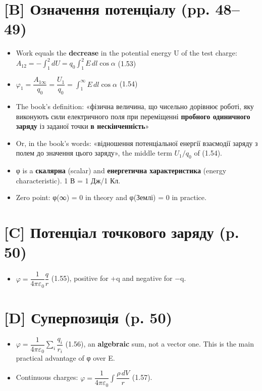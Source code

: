 \documentclass[11pt,a4paper,oneside]{book}
\begin{document}
\section*{[B] Означення потенціалу (pp. 48–49)}
\begin{itemize}
\item Work equals the \textbf{decrease} in the potential energy U of the test charge: $A_{12} = -\int_1^2 dU = q_0\int_1^2 E\,dl\cos\alpha$ (1.53)
\item $\varphi_1 = \dfrac{A_{1\infty}}{q_0} = \dfrac{U_1}{q_0} = \int_1^\infty E\,dl\cos\alpha$ (1.54)
\item The book's definition: «фізична величина, що чисельно дорівнює роботі, яку виконують сили електричного поля при переміщенні \textbf{пробного одиничного заряду} із заданої точки \textbf{в нескінченність}»
\item Or, in the book's words: «відношення потенціальної енергії взаємодії заряду з полем до значення цього заряду», the middle term $U_1/q_0$ of (1.54).
\item φ is a \textbf{скалярна} (scalar) and \textbf{енергетична характеристика} (energy characteristic). 1 В = 1 Дж/1 Кл.
\item Zero point: φ(∞) = 0 in theory and φ(Землі) = 0 in practice.
\end{itemize}

\section*{[C] Потенціал точкового заряду (p. 50)}
\begin{itemize}
\item $\varphi = \dfrac{1}{4\pi\varepsilon_0}\dfrac{q}{r}$ (1.55), positive for +q and negative for −q.
\end{itemize}

\section*{[D] Суперпозиція (p. 50)}
\begin{itemize}
\item $\varphi = \dfrac{1}{4\pi\varepsilon_0}\sum_i \dfrac{q_i}{r_i}$ (1.56), an \textbf{algebraic} sum, not a vector one. This is the main practical advantage of φ over E.
\item Continuous charges: $\varphi = \dfrac{1}{4\pi\varepsilon_0}\int \dfrac{\rho\,dV}{r}$ (1.57).
\end{itemize}
\end{document}
